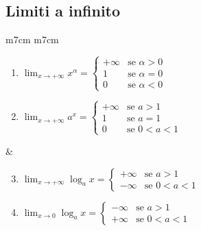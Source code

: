 \documentclass[a4paper]{article}
\begin{document}
\subsection{Limiti a infinito}
\begin{center}
	\begin{tabular}{m{7cm} m{7cm}}
		\begin{enumerate}
			\item \(\displaystyle \lim_{x \to + \infty} x ^ \alpha =
			\begin{cases}
				+ \infty & \text{se } \alpha > 0 \\
				1 & \text{se } \alpha = 0 \\
				0 & \text{se } \alpha < 0
			\end{cases}\)
			\item \(\displaystyle \lim_{x \to + \infty} a ^ x =
			\begin{cases}
				+ \infty & \text{se } a > 1 \\
				1 & \text{se } a = 1 \\
				0 & \text{se } 0 < a < 1
			\end{cases}\)
		\end{enumerate}
		&
		\begin{enumerate}
			\setcounter{enumi}{2}
			\item \(\displaystyle \lim_{x \to + \infty} \log_a x =
			\begin{cases}
				+ \infty & \text{se } a > 1 \\
				- \infty & \text{se } 0 < a < 1
			\end{cases}\)
			\item \(\displaystyle \lim_{x \to 0} \log_a x =
			\begin{cases}
				- \infty & \text{se } a > 1 \\
				+ \infty & \text{se } 0 < a < 1
			\end{cases}\)
		\end{enumerate}
	\end{tabular}
\end{center}
\end{document}
